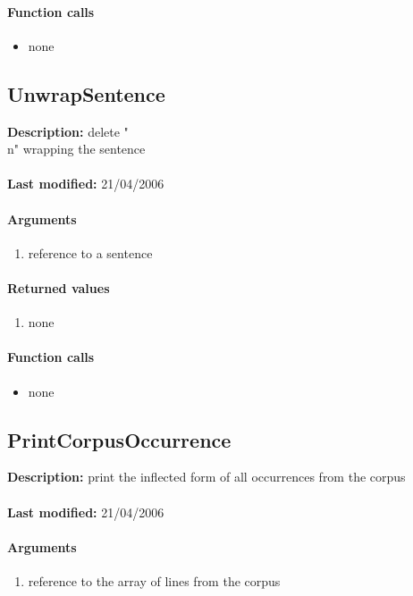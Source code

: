 \paragraph{Function calls}
\begin{itemize}
\item none
\end{itemize}

\subsection{UnwrapSentence}
\textbf{Description:} delete "\\n" wrapping the sentence\\
\\\textbf{Last modified:} 21/04/2006

\paragraph{Arguments}
\begin{enumerate}
\item reference to a sentence
\end{enumerate}

\paragraph{Returned values}
\begin{enumerate}
\item none
\end{enumerate}

\paragraph{Function calls}
\begin{itemize}
\item none
\end{itemize}

\subsection{PrintCorpusOccurrence}
\textbf{Description:} print the inflected form of all occurrences from the corpus\\
\\\textbf{Last modified:} 21/04/2006

\paragraph{Arguments}
\begin{enumerate}
\item reference to the array of lines from the corpus
\end{enumerate}

